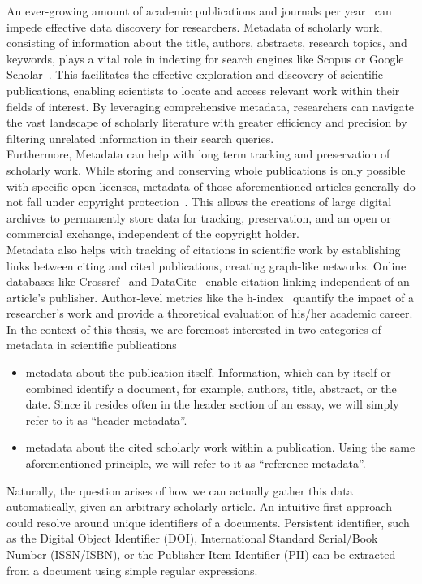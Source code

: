 An ever-growing amount of academic publications and journals per year~\cite{fire2019over} can impede effective data discovery for researchers. Metadata of scholarly work, consisting of information about the title, authors, abstracts, research topics, and keywords, plays a vital role in indexing for search engines like Scopus or Google Scholar~\cite{ahmar2018lecturers}. This facilitates the effective exploration and discovery of scientific publications, enabling scientists to locate and access relevant work within their fields of interest. By leveraging comprehensive metadata, researchers can navigate the vast landscape of scholarly literature with greater efficiency and precision by filtering unrelated information in their search queries.\\
Furthermore, Metadata can help with long term tracking and preservation of scholarly work. While storing and conserving whole publications is only possible with specific open licenses, metadata of those aforementioned articles generally do not fall under copyright protection~\cite{cox2017metadata}. This allows the creations of large digital archives to permanently store data for tracking, preservation, and an open or commercial exchange, independent of the copyright holder.\\
Metadata also helps with tracking of citations in scientific work by establishing links between citing and cited publications, creating graph-like networks. Online databases like Crossref~\cite{bartell_crossref_nodate} and DataCite~\cite{noauthor_datacite_nodate} enable citation linking independent of an article's publisher. Author-level metrics like the h-index~\cite{hirsch2005index} quantify the impact of a researcher's work and provide a theoretical evaluation of his/her academic career.\\
In the context of this thesis, we are foremost interested in two categories of metadata in scientific publications
\begin{itemize}
    \item metadata about the publication itself. Information, which can by itself or combined identify a document, for example, authors, title, abstract, or the date. Since it resides often in the header section of an essay, we will simply refer to it as \enquote{header metadata}.
    \item metadata about the cited scholarly work within a publication. Using the same aforementioned principle, we will refer to it as \enquote{reference metadata}.
\end{itemize}
Naturally, the question arises of how we can actually gather this data automatically, given an arbitrary scholarly article.
An intuitive first approach could resolve around unique identifiers of a documents. Persistent identifier, such as the Digital Object Identifier (DOI), International Standard Serial/Book Number (ISSN/ISBN), or the Publisher Item Identifier (PII) can be extracted from a document using simple regular expressions.
\newpage

